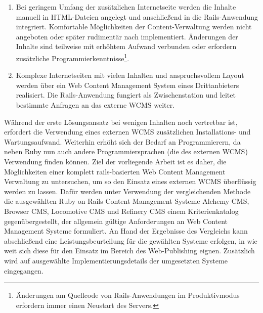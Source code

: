 \begin{enumerate}
\item{
Bei geringem Umfang der zusätzlichen Internetseite werden die Inhalte manuell in HTML-Dateien angelegt und anschließend in die Rails-Anwendung integriert. Komfortable Möglichkeiten der Content-Verwaltung werden nicht angeboten oder später rudimentär nach implementiert. Änderungen der Inhalte sind teilweise mit erhöhtem Aufwand verbunden oder erfordern zusätzliche Programmierkenntnisse\footnote{Änderungen am Quellcode von Rails-Anwendungen im Produktivmodus erfordern immer einen Neustart des Servers.}.
}

\item{
Komplexe Internetseiten mit vielen Inhalten und anspruchsvollem Layout werden über ein Web Content Management System eines Drittanbieters realisiert. Die Rails-Anwendung fungiert als Zwischenstation und leitet bestimmte Anfragen an das externe WCMS weiter.
}
\end{enumerate}Während der erste Lösungsansatz bei wenigen Inhalten noch vertretbar ist, erfordert die Verwendung eines externen WCMS zusätzlichen Installations- und Wartungsaufwand. Weiterhin erhöht sich der Bedarf an Programmierern, da neben Ruby nun auch andere Programmiersprachen (die des externen WCMS) Verwendung finden können.
\newline
\newline
Ziel der vorliegende Arbeit ist es daher, die Möglichkeiten einer komplett rails-basierten Web Content Management Verwaltung zu untersuchen, um so den Einsatz eines externen WCMS überflüssig werden zu lassen.
\newline
\newline
Dafür werden unter Verwendung der vergleichenden Methode die ausgewählten Ruby on Rails Content Management Systeme Alchemy CMS, Browser CMS, Locomotive CMS und Refinery CMS einem Kriterienkatalog gegenübergestellt, der allgemein gültige Anforderungen an Web Content Management Systeme formuliert. An Hand der Ergebnisse des Vergleichs kann abschließend eine Leistungsbeurteilung für die gewählten Systeme erfolgen, in wie weit sich diese für den Einsatz im Bereich des Web-Publishing eignen. Zusätzlich wird auf ausgewählte Implementierungsdetails der umgesetzten Systeme eingegangen.

